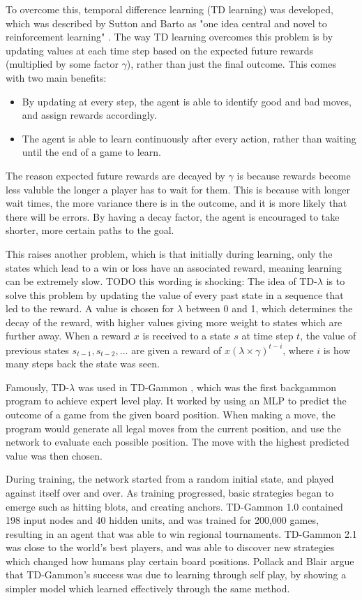 To overcome this, temporal difference learning (TD learning) was developed, which was described by Sutton and Barto as "one idea central and novel to reinforcement learning" \cite{Sutton2018}.
The way TD learning overcomes this problem is by updating values at each time step based on the expected future rewards (multiplied by some factor $\gamma$), rather than just the final outcome. This comes with two main benefits:
\begin{itemize}
    \item By updating at every step, the agent is able to identify good and bad moves, and assign rewards accordingly.
    \item The agent is able to learn continuously after every action, rather than waiting until the end of a game to learn.
\end{itemize}
The reason expected future rewards are decayed by $\gamma$ is because rewards become less valuble the longer a player has to wait for them. 
This is because with longer wait times, the more variance there is in the outcome, and it is more likely that there will be errors. 
By having a decay factor, the agent is encouraged to take shorter, more certain paths to the goal.

This raises another problem, which is that initially during learning, only the states which lead to a win or loss have an associated reward, meaning learning can be extremely slow.
TODO this wording is shocking: The idea of TD-$\lambda$ is to solve this problem by updating the value of every past state in a sequence that led to the reward.
A value is chosen for $\lambda$ between 0 and 1, which determines the decay of the reward, with higher values giving more weight to states which are further away.
When a reward $x$ is received to a state $s$ at time step $t$, the value of previous states $s_{t-1}, s_{t-2}, ...$ are given a reward of $x (\lambda \times \gamma)^{t - i}$, where $i$ is how many steps back the state was seen.

Famously, TD-$\lambda$ was used in TD-Gammon \cite{Tesauro1995}, which was the first backgammon program to achieve expert level play.
It worked by using an MLP to predict the outcome of a game from the given board position. 
When making a move, the program would generate all legal moves from the current position, and use the network to evaluate each possible position.
The move with the highest predicted value was then chosen.

During training, the network started from a random initial state, and played against itself over and over. 
As training progressed, basic strategies began to emerge such as hitting blots, and creating anchors. 
TD-Gammon 1.0 contained 198 input nodes and 40 hidden units, and was trained for 200,000 games, resulting in an agent that was able to win regional tournaments.
TD-Gammon 2.1 was close to the world's best players, and was able to discover new strategies which changed how humans play certain board positions.
Pollack and Blair \cite{Pollack1997} argue that TD-Gammon's success was due to learning through self play, by showing a simpler model which learned effectively through the same method. 

